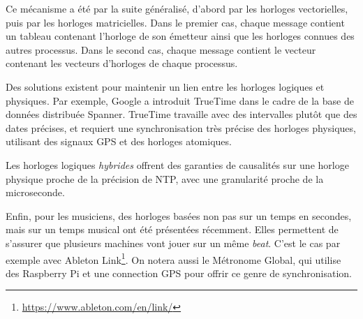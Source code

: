 \documentclass{article}
\begin{document}
Ce mécanisme a été par la suite généralisé, d'abord par les horloges vectorielles, puis par les horloges matricielles. 
Dans le premier cas, chaque message contient un tableau contenant l'horloge de son émetteur ainsi que les horloges connues des autres processus. Dans le second cas, chaque message contient le vecteur contenant les vecteurs d'horloges de chaque processus.

Des solutions existent pour maintenir un lien entre les horloges logiques et physiques. 
Par exemple, Google a introduit TrueTime dans le cadre de la base de données distribuée Spanner\cite{corbett2013spanner}. 
TrueTime travaille avec des intervalles plutôt que des dates précises, et requiert une synchronisation très précise des horloges physiques, utilisant des signaux GPS et des horloges atomiques.

Les horloges logiques \textit{hybrides}\cite{kulkarni2014logical} offrent des garanties de causalités sur une horloge physique proche de la précision de NTP, avec une granularité proche de la microseconde.

Enfin, pour les musiciens, des horloges basées non pas sur un temps en secondes, mais sur un temps musical ont été présentées récemment. Elles permettent de s'assurer que plusieurs machines vont jouer sur un même \textit{beat}. C'est le cas par exemple avec Ableton Link\footnote{\url{https://www.ableton.com/en/link/}}. 
On notera aussi le Métronome Global\cite{oda2016global}, qui utilise des Raspberry Pi et une connection GPS pour offrir ce genre de synchronisation.

\end{document}
